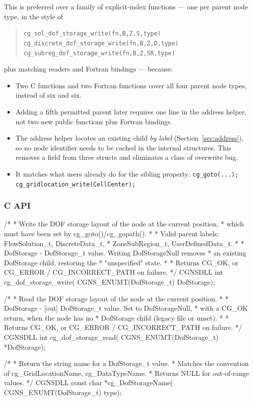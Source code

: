 \documentclass[11pt,letterpaper]{article}
\makeatletter
\let\cgns@orig@lstlisting\lstlisting
\let\cgns@endorig@lstlisting\endlstlisting
\renewenvironment{lstlisting}
  {\par\needspace{5\baselineskip}\nolinenumbers\cgns@orig@lstlisting}
  {\cgns@endorig@lstlisting\par\linenumbers}
\makeatother
\begin{document}
This is preferred over a family of explicit-index functions --- one per
parent node type, in the style of

\begin{quote}
\texttt{cg\_sol\_dof\_storage\_write(fn,B,Z,S,type)} \\
\texttt{cg\_discrete\_dof\_storage\_write(fn,B,Z,D,type)} \\
\texttt{cg\_subreg\_dof\_storage\_write(fn,B,Z,SR,type)}
\end{quote}

\noindent plus matching readers and Fortran bindings --- because:

\begin{itemize}[leftmargin=2em]
\item Two C functions and two Fortran functions cover all four parent
  node types, instead of six and six.
\item Adding a fifth permitted parent later requires one line in the
  address helper, not two new public functions plus Fortran bindings.
\item The address helper locates an existing child \emph{by label}
  (Section~\ref{sec:address}), so no node identifier needs to be cached
  in the internal structures.  This removes a field from three structs
  and eliminates a class of overwrite bug.
\item It matches what users already do for the sibling property:
  \texttt{cg\_goto(...); cg\_gridlocation\_write(CellCenter);}
\end{itemize}

\subsubsection{C API}

\begin{lstlisting}[language=C]
/*
 * Write the DOF storage layout of the node at the current position,
 * which must have been set by cg_goto()/cg_gopath().
 *
 * Valid parent labels: FlowSolution_t, DiscreteData_t,
 *                      ZoneSubRegion_t, UserDefinedData_t.
 *
 * DofStorage - DofStorage_t value.  Writing DofStorageNull removes
 *              an existing DofStorage child, restoring the
 *              "unspecified" state.
 *
 * Returns CG_OK, or CG_ERROR / CG_INCORRECT_PATH on failure.
 */
CGNSDLL int cg_dof_storage_write(
    CGNS_ENUMT(DofStorage_t) DofStorage);

/*
 * Read the DOF storage layout of the node at the current position.
 *
 * DofStorage - [out] DofStorage_t value.  Set to DofStorageNull,
 *              with a CG_OK return, when the node has no
 *              DofStorage child (legacy file or unset).
 *
 * Returns CG_OK, or CG_ERROR / CG_INCORRECT_PATH on failure.
 */
CGNSDLL int cg_dof_storage_read(
    CGNS_ENUMT(DofStorage_t) *DofStorage);

/*
 * Return the string name for a DofStorage_t value.
 * Matches the convention of cg_GridLocationName, cg_DataTypeName.
 * Returns NULL for out-of-range values.
 */
CGNSDLL const char *cg_DofStorageName(
    CGNS_ENUMT(DofStorage_t) type);
\end{lstlisting}
\end{document}
